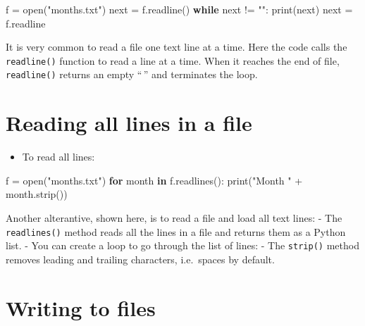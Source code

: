 \documentclass[
  letterpaper,
]{scrbook}
\newenvironment{Shaded}{\begin{snugshade}}{\end{snugshade}}
\newcommand{\BuiltInTok}[1]{\textcolor[rgb]{0.00,0.23,0.31}{#1}}
\newcommand{\ControlFlowTok}[1]{\textcolor[rgb]{0.00,0.23,0.31}{\textbf{#1}}}
\newcommand{\KeywordTok}[1]{\textcolor[rgb]{0.00,0.23,0.31}{\textbf{#1}}}
\newcommand{\NormalTok}[1]{\textcolor[rgb]{0.00,0.23,0.31}{#1}}
\newcommand{\OperatorTok}[1]{\textcolor[rgb]{0.37,0.37,0.37}{#1}}
\newcommand{\StringTok}[1]{\textcolor[rgb]{0.13,0.47,0.30}{#1}}
\providecommand{\tightlist}{%
  \setlength{\itemsep}{0pt}\setlength{\parskip}{0pt}}
\begin{document}
\begin{Shaded}
\begin{Highlighting}[]
\NormalTok{f }\OperatorTok{=} \BuiltInTok{open}\NormalTok{(}\StringTok{"months.txt"}\NormalTok{)}
\BuiltInTok{next} \OperatorTok{=}\NormalTok{ f.readline()}
\ControlFlowTok{while} \BuiltInTok{next} \OperatorTok{!=} \StringTok{""}\NormalTok{:}
    \BuiltInTok{print}\NormalTok{(}\BuiltInTok{next}\NormalTok{)}
    \BuiltInTok{next} \OperatorTok{=}\NormalTok{ f.readline}
\end{Highlighting}
\end{Shaded}

It is very common to read a file one text line at a time. Here the code
calls the \texttt{readline()} function to read a line at a time. When it
reaches the end of file, \texttt{readline()} returns an empty ``\,'' and
terminates the loop.

\section*{Reading all lines in a
file}\label{reading-all-lines-in-a-file}


\begin{itemize}
\tightlist
\item
  To read all lines:
\end{itemize}

\begin{Shaded}
\begin{Highlighting}[]
\NormalTok{f }\OperatorTok{=} \BuiltInTok{open}\NormalTok{(}\StringTok{"months.txt"}\NormalTok{)}
\ControlFlowTok{for}\NormalTok{ month }\KeywordTok{in}\NormalTok{ f.readlines():}
   \BuiltInTok{print}\NormalTok{(}\StringTok{"Month "} \OperatorTok{+}\NormalTok{ month.strip())}
\end{Highlighting}
\end{Shaded}

Another alterantive, shown here, is to read a file and load all text
lines: - The \texttt{readlines()} method reads all the lines in a file
and returns them as a Python list. - You can create a loop to go through
the list of lines: - The \texttt{strip()} method removes leading and
trailing characters, i.e.~spaces by default.

\section*{Writing to files}\label{writing-to-files}
\end{document}
